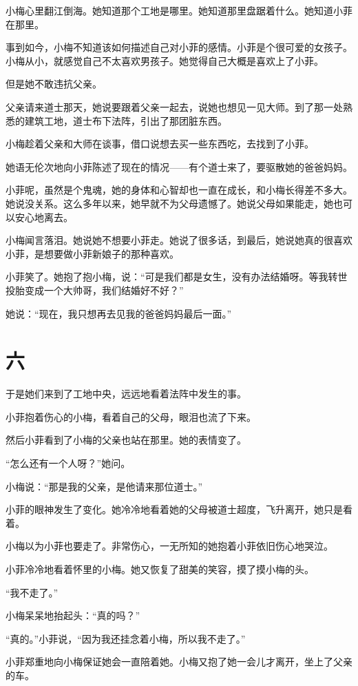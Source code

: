 \documentclass[12pt,a4paper]{ctexart}
\begin{document}
小梅心里翻江倒海。她知道那个工地是哪里。她知道那里盘踞着什么。她知道小菲在那里。

事到如今，小梅不知道该如何描述自己对小菲的感情。小菲是个很可爱的女孩子。小梅从小，就感觉自己不太喜欢男孩子。她觉得自己大概是喜欢上了小菲。

但是她不敢违抗父亲。

父亲请来道士那天，她说要跟着父亲一起去，说她也想见一见大师。到了那一处熟悉的建筑工地，道士布下法阵，引出了那团脏东西。

小梅趁着父亲和大师在谈事，借口说想去买一些东西吃，去找到了小菲。

她语无伦次地向小菲陈述了现在的情况——有个道士来了，要驱散她的爸爸妈妈。

小菲呢，虽然是个鬼魂，她的身体和心智却也一直在成长，和小梅长得差不多大。她说没关系。这么多年以来，她早就不为父母遗憾了。她说父母如果能走，她也可以安心地离去。

小梅闻言落泪。她说她不想要小菲走。她说了很多话，到最后，她说她真的很喜欢小菲，是想要做小菲新娘子的那种喜欢。

小菲笑了。她抱了抱小梅，说：“可是我们都是女生，没有办法结婚呀。等我转世投胎变成一个大帅哥，我们结婚好不好？”

她说：“现在，我只想再去见我的爸爸妈妈最后一面。”

\section*{六}

于是她们来到了工地中央，远远地看着法阵中发生的事。

小菲抱着伤心的小梅，看着自己的父母，眼泪也流了下来。

然后小菲看到了小梅的父亲也站在那里。她的表情变了。

“怎么还有一个人呀？”她问。

小梅说：“那是我的父亲，是他请来那位道士。”

小菲的眼神发生了变化。她冷冷地看着她的父母被道士超度，飞升离开，她只是看着。

小梅以为小菲也要走了。非常伤心，一无所知的她抱着小菲依旧伤心地哭泣。

小菲冷冷地看着怀里的小梅。她又恢复了甜美的笑容，摸了摸小梅的头。

“我不走了。”

小梅呆呆地抬起头：“真的吗？”

“真的。”小菲说，“因为我还挂念着小梅，所以我不走了。”

小菲郑重地向小梅保证她会一直陪着她。小梅又抱了她一会儿才离开，坐上了父亲的车。
\end{document}
